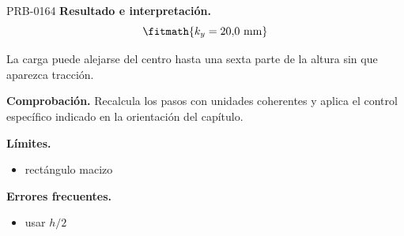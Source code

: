 \begin{studiumworked}{PRB-0164}
\textbf{Resultado e interpretación.}\[\fitmath{k_y = 20{,}0\ \mathrm{mm}}\]

La carga puede alejarse del centro hasta una sexta parte de la altura sin que aparezca tracción.

\par\textbf{Comprobación.} Recalcula los pasos con unidades coherentes y aplica el control específico indicado en la orientación del capítulo.

\textbf{Límites.}\begin{itemize}\item rectángulo macizo\end{itemize}

\textbf{Errores frecuentes.}\begin{itemize}\item usar $h/2$\end{itemize}

\end{studiumworked}

\Needspace{.3\textheight}

